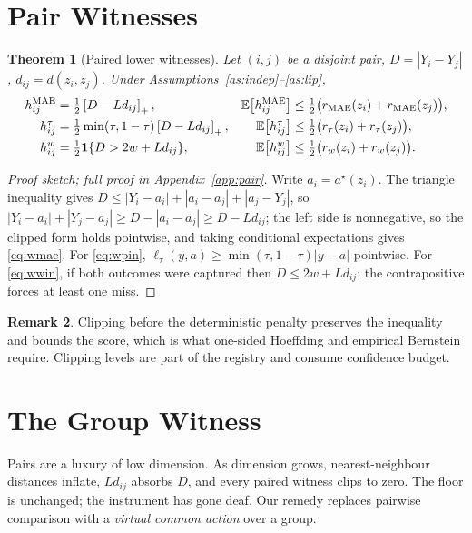 \documentclass[11pt]{article}
\newtheorem{theorem}{Theorem}
\theoremstyle{definition}
\newtheorem{remark}[theorem]{Remark}
\newcommand{\E}{\mathbb{E}}
\newcommand{\ind}{\mathbf{1}}
\newcommand{\clip}[1]{\left[#1\right]_+}
\begin{document}
\section{Pair Witnesses}\label{sec:pair}

\begin{theorem}[Paired lower witnesses]\label{thm:pair}
Let $(i,j)$ be a disjoint pair, $D=|Y_i-Y_j|$, $d_{ij}=d(z_i,z_j)$. Under Assumptions~\ref{as:indep}--\ref{as:lip},
\begin{align}
h^{\rm MAE}_{ij}&=\tfrac12\clip{D-L d_{ij}}, &
\E\big[h^{\rm MAE}_{ij}\big] &\le \tfrac12\big(r_{\rm MAE}(z_i)+r_{\rm MAE}(z_j)\big),\label{eq:wmae}\\
h^{\tau}_{ij}&=\tfrac12\min(\tau,1-\tau)\clip{D-L d_{ij}}, &
\E\big[h^{\tau}_{ij}\big] &\le \tfrac12\big(r_{\tau}(z_i)+r_{\tau}(z_j)\big),\label{eq:wpin}\\
h^{w}_{ij}&=\tfrac12\ind\{D>2w+L d_{ij}\}, &
\E\big[h^{w}_{ij}\big] &\le \tfrac12\big(r_{w}(z_i)+r_{w}(z_j)\big).\label{eq:wwin}
\end{align}
\end{theorem}

\begin{proof}[Proof sketch; full proof in Appendix~\ref{app:pair}]
Write $a_i=a^\star(z_i)$. The triangle inequality gives $D\le|Y_i-a_i|+|a_i-a_j|+|a_j-Y_j|$, so $|Y_i-a_i|+|Y_j-a_j|\ge D-|a_i-a_j|\ge D-Ld_{ij}$; the left side is nonnegative, so the clipped form holds pointwise, and taking conditional expectations gives \eqref{eq:wmae}. For \eqref{eq:wpin}, $\ell_\tau(y,a)\ge\min(\tau,1-\tau)|y-a|$ pointwise. For \eqref{eq:wwin}, if both outcomes were captured then $D\le 2w+Ld_{ij}$; the contrapositive forces at least one miss.
\end{proof}

\begin{remark}
Clipping before the deterministic penalty preserves the inequality and bounds the score, which is what one-sided Hoeffding and empirical Bernstein require. Clipping levels are part of the registry and consume confidence budget.
\end{remark}

\section{The Group Witness}\label{sec:group}

Pairs are a luxury of low dimension. As dimension grows, nearest-neighbour distances inflate, $Ld_{ij}$ absorbs $D$, and every paired witness clips to zero. The floor is unchanged; the instrument has gone deaf. Our remedy replaces pairwise comparison with a \emph{virtual common action} over a group.
\end{document}
